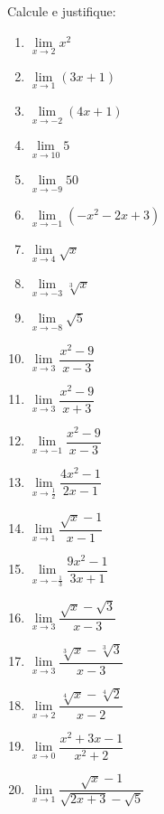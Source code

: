 \begin{exercicio}[1]
Calcule e justifique:
\begin{enumerate}[label=\alph*)]
    \item $\lim\limits_{x \to 2} x^2$
    \item $\lim\limits_{x \to 1} (3x + 1)$
    \item $\lim\limits_{x \to -2} (4x + 1)$
    \item $\lim\limits_{x \to 10} 5$
    \item $\lim\limits_{x \to -9} 50$
    \item $\lim\limits_{x \to -1} (-x^2 - 2x + 3)$
    \item $\lim\limits_{x \to 4} \sqrt{x}$
    \item $\lim\limits_{x \to -3} \sqrt[3]{x}$
    \item $\lim\limits_{x \to -8} \sqrt{5}$
    \item $\lim\limits_{x \to 3} \dfrac{x^2 - 9}{x - 3}$
    \item $\lim\limits_{x \to 3} \dfrac{x^2 - 9}{x + 3}$
    \item $\lim\limits_{x \to -1} \dfrac{x^2 - 9}{x - 3}$
    \item $\lim\limits_{x \to \frac{1}{2}} \dfrac{4x^2 - 1}{2x - 1}$
    \item $\lim\limits_{x \to 1} \dfrac{\sqrt{x} - 1}{x - 1}$
    \item $\lim\limits_{x \to -\frac{1}{3}} \dfrac{9x^2 - 1}{3x + 1}$
    \item $\lim\limits_{x \to 3} \dfrac{\sqrt{x} - \sqrt{3}}{x - 3}$
    \item $\lim\limits_{x \to 3} \dfrac{\sqrt[3]{x} - \sqrt[3]{3}}{x - 3}$
    \item $\lim\limits_{x \to 2} \dfrac{\sqrt[4]{x} - \sqrt[4]{2}}{x - 2}$
    \item $\lim\limits_{x \to 0} \dfrac{x^2 + 3x - 1}{x^2 + 2}$
    \item $\lim\limits_{x \to 1} \dfrac{\sqrt{x} - 1}{\sqrt{2x + 3} - \sqrt{5}}$
\end{enumerate}
\end{exercicio}

